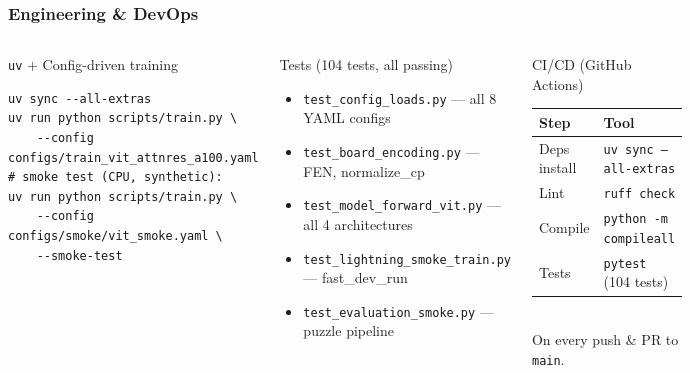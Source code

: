 \documentclass{beamer}
\begin{document}
\begin{frame}[fragile]
\frametitle{Engineering \& DevOps}

\begin{columns}

\begin{block}{\texttt{uv} + Config-driven training}
\scriptsize
\begin{verbatim}
uv sync --all-extras
uv run python scripts/train.py \
    --config configs/train_vit_attnres_a100.yaml
# smoke test (CPU, synthetic):
uv run python scripts/train.py \
    --config configs/smoke/vit_smoke.yaml \
    --smoke-test
\end{verbatim}
\end{block}

\begin{block}{Tests (104 tests, all passing)}
\footnotesize
\begin{itemize}
  \item \texttt{test\_config\_loads.py} --- all 8 YAML configs
  \item \texttt{test\_board\_encoding.py} --- FEN, normalize\_cp
  \item \texttt{test\_model\_forward\_vit.py} --- all 4 architectures
  \item \texttt{test\_lightning\_smoke\_train.py} --- fast\_dev\_run
  \item \texttt{test\_evaluation\_smoke.py} --- puzzle pipeline
\end{itemize}
\end{block}


\begin{block}{CI/CD (GitHub Actions)}
\footnotesize
\begin{tabular}{ll}
\toprule
\textbf{Step} & \textbf{Tool} \\
\midrule
Deps install & \texttt{uv sync --all-extras} \\
Lint         & \texttt{ruff check} \\
Compile      & \texttt{python -m compileall} \\
Tests        & \texttt{pytest} (104 tests) \\
\bottomrule
\end{tabular}\\[0.2em]
\footnotesize On every push \& PR to \texttt{main}.
\end{block}


\end{columns}
\end{frame}
\end{document}
